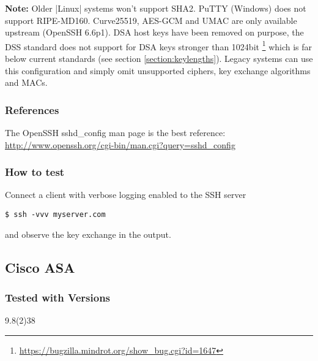 \textbf{Note:} Older |Linux| systems won't support SHA2. PuTTY (Windows) does not support
RIPE-MD160. Curve25519, AES-GCM and UMAC are only available upstream (OpenSSH
6.6p1). DSA host keys have been removed on purpose, the DSS standard does not
support for DSA keys stronger than 1024bit
\footnote{\url{https://bugzilla.mindrot.org/show_bug.cgi?id=1647}} which is far
below current standards (see section \ref{section:keylengths}). Legacy systems
can use this configuration and simply omit unsupported ciphers, key exchange
algorithms and MACs.

\subsubsection{References}
The OpenSSH sshd\_config  man page is the best reference: \url{http://www.openssh.org/cgi-bin/man.cgi?query=sshd_config}

\subsubsection{How to test}
Connect a client with verbose logging enabled to the SSH server
\begin{lstlisting}
$ ssh -vvv myserver.com
\end{lstlisting}and observe the key exchange in the output.


\subsection{Cisco ASA}
\subsubsection{Tested with Versions}
\begin{itemize*}
  \item 9.8(2)38
\end{itemize*}


